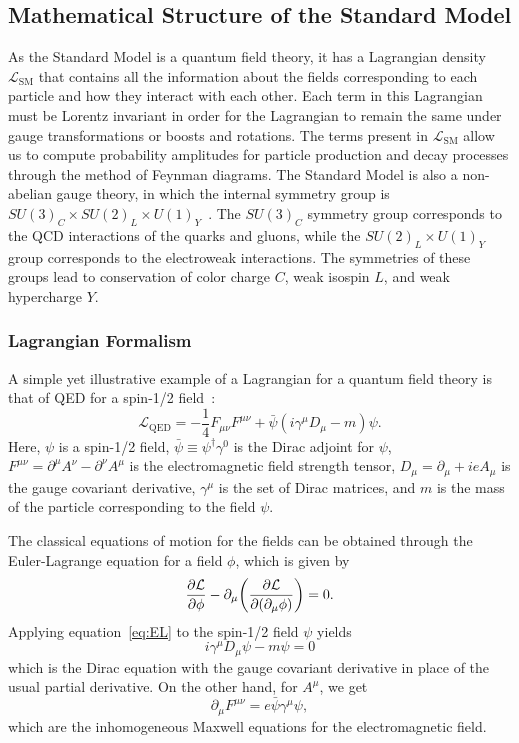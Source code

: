 \subsection{Mathematical Structure of the Standard Model}
As the Standard Model is a quantum field theory, it has a Lagrangian density $\mathcal{L}_\mathrm{SM}$ that contains all the information about the fields corresponding to each particle and how they interact with each other.
Each term in this Lagrangian must be Lorentz invariant in order for the Lagrangian to remain the same under gauge transformations or boosts and rotations.
The terms present in $\mathcal{L}_\mathrm{SM}$ allow us to compute probability amplitudes for particle production and decay processes through the method of Feynman diagrams.
The Standard Model is also a non-abelian gauge theory, in which the internal symmetry group is $SU(3)_C\times SU(2)_L\times U(1)_Y$~\cite{Srednicki:1019751}.
The $SU(3)_C$ symmetry group corresponds to the QCD interactions of the quarks and gluons, while the $SU(2)_L\times U(1)_Y$ group corresponds to the electroweak interactions.
The symmetries of these groups lead to conservation of color charge $C$, weak isospin $L$, and weak hypercharge $Y$. %

\subsubsection{Lagrangian Formalism}
A simple yet illustrative example of a Lagrangian for a quantum field theory is that of QED for a spin-1/2 field~\cite{Klauber:2013ipa}:
\begin{equation}\label{eq:QED}
  \mathcal{L}_\mathrm{QED}=-\frac{1}{4}F_{\mu\nu}F^{\mu\nu}+\bar{\psi}(i\gamma^\mu D_\mu-m)\psi.
\end{equation}
Here, $\psi$ is a spin-1/2 field, $\bar{\psi}\equiv\psi^\dagger\gamma^0$ is the Dirac adjoint for $\psi$, $F^{\mu\nu}=\partial^\mu A^\nu-\partial^\nu A^\mu$ is the electromagnetic field strength tensor, $D_\mu=\partial_\mu+ieA_\mu$ is the gauge covariant derivative, $\gamma^\mu$ is the set of Dirac matrices, and $m$ is the mass of the particle corresponding to the field $\psi$.

The classical equations of motion for the fields can be obtained through the Euler-Lagrange equation for a field $\phi$, which is given by
\begin{equation}\label{eq:EL}
  \pdv{\mathcal{L}}{\phi}-\partial_\mu\pqty{\pdv{\mathcal{L}}{(\partial_\mu\phi)}}=0.
\end{equation}
Applying equation~\ref{eq:EL} to the spin-1/2 field $\psi$ yields
\begin{equation}
  i\gamma^\mu D_\mu\psi-m\psi=0
\end{equation}
which is the Dirac equation with the gauge covariant derivative in place of the usual partial derivative.
On the other hand, for $A^\mu$, we get
\begin{equation}
  \partial_\mu F^{\mu\nu}=e\bar{\psi}\gamma^\mu\psi,
\end{equation}
which are the inhomogeneous Maxwell equations for the electromagnetic field.

